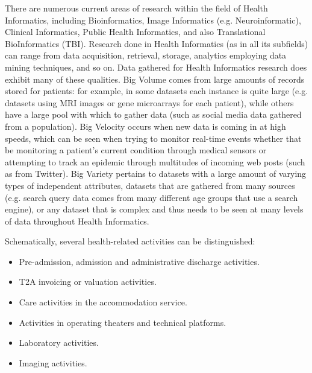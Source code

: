   \newpage
There are numerous current areas of research within the field of Health Informatics, including Bioinformatics, Image Informatics (e.g. Neuroinformatic), Clinical Informatics, Public Health Informatics, and also Translational BioInformatics (TBI). Research done in Health Informatics (as in all its subfields) can range from data acquisition, retrieval, storage, analytics employing data mining techniques, and so on.
\bigbreak
Data gathered for Health Informatics research does exhibit many of these qualities. Big Volume comes from large amounts of records stored for patients: for example, in some datasets each instance is quite large (e.g. datasets using MRI images or gene microarrays for each patient), while others have a large pool with which to gather data (such as social media data gathered from a population). Big Velocity occurs when new data is coming in at high speeds, which can be seen when trying to monitor real-time events whether that be monitoring a patient’s current condition through medical sensors or attempting to track an epidemic through multitudes of incoming web posts (such as from Twitter). Big Variety pertains to datasets with a large amount of varying types of independent attributes, datasets that are gathered from many sources (e.g. search query data comes from many different age groups that use a search engine), or any dataset that is complex and thus needs to be seen at many levels of data throughout Health Informatics.

\newpage
Schematically, several health-related activities can be distinguished\cite{martigneneVisualisationUnifieeDonnees}:
\begin{itemize}
  \item Pre-admission, admission and administrative discharge activities.
  \item T2A invoicing or valuation activities.
  \item Care activities in the accommodation service.
  \item Activities in operating theaters and technical platforms.
  \item Laboratory activities.
  \item Imaging activities.
\end{itemize}

